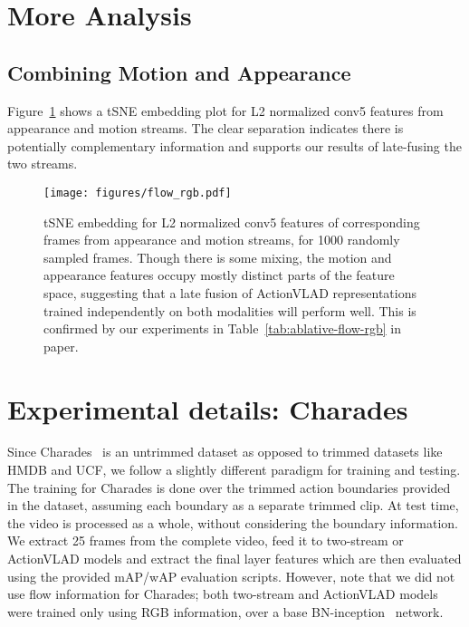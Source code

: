 \documentclass[10pt,twocolumn,letterpaper]{article}
\newcommand{\methodTag}[0]{ActionVLAD}
\begin{document}
\section{More Analysis}

\subsection{Combining Motion and Appearance}

Figure~\ref{fig:sup:conv5} shows a tSNE embedding plot for L2 normalized conv5 features from appearance and motion streams. The clear separation indicates there is potentially
complementary information and supports our results of late-fusing the two streams.
\begin{figure}
    \centering
    \texttt{[image: figures/flow\_rgb.pdf]}
    \caption{tSNE embedding for L2 normalized conv5 features of corresponding frames from appearance and motion streams, for 1000 randomly sampled frames.
    Though there is some mixing, the motion and appearance features occupy mostly distinct parts of the feature space, suggesting that a late fusion of ActionVLAD representations trained independently on both modalities will perform well. This is confirmed by our experiments
    in Table~\ref{tab:ablative-flow-rgb} in paper.}\label{fig:sup:conv5}
\end{figure}

\section{Experimental details: Charades}

Since Charades~\cite{charades} is an untrimmed dataset as opposed to trimmed datasets like HMDB and UCF, we
follow a slightly different paradigm for training and testing. The training for Charades is done
over the trimmed action boundaries provided in the dataset, assuming each boundary as a 
separate trimmed clip. At test time, the video is processed as a whole, without considering
the boundary information. We extract 25 frames from the complete video, feed it
to two-stream or \methodTag{} models and extract the final layer features which are then
evaluated using the provided mAP/wAP evaluation scripts. However, note that we did not use 
flow information for Charades; both two-stream and \methodTag{} models were trained
only using RGB information, over a base BN-inception~\cite{WangL_16a} network.
 
\end{document}
